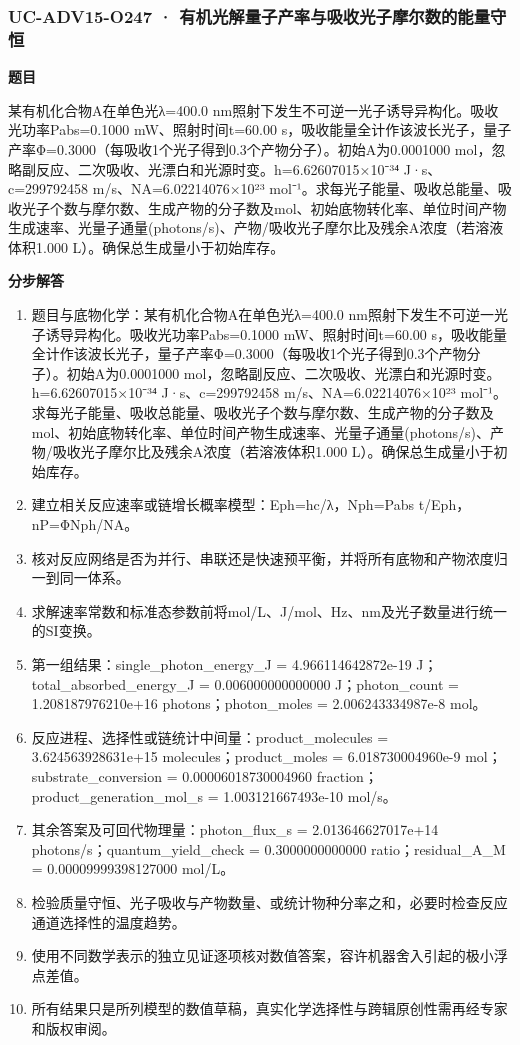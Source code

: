 \documentclass[UTF8,11pt,a4paper]{ctexart}
\begin{document}
\subsubsection*{UC-ADV15-O247 · 有机光解量子产率与吸收光子摩尔数的能量守恒}
\noindent\textbf{题目}\par
某有机化合物A在单色光λ=400.0 nm照射下发生不可逆一光子诱导异构化。吸收光功率Pabs=0.1000 mW、照射时间t=60.00 s，吸收能量全计作该波长光子，量子产率Φ=0.3000（每吸收1个光子得到0.3个产物分子）。初始A为0.0001000 mol，忽略副反应、二次吸收、光漂白和光源时变。h=6.62607015×10⁻³⁴ J·s、c=299792458 m/s、NA=6.02214076×10²³ mol⁻¹。求每光子能量、吸收总能量、吸收光子个数与摩尔数、生成产物的分子数及mol、初始底物转化率、单位时间产物生成速率、光量子通量(photons/s)、产物/吸收光子摩尔比及残余A浓度（若溶液体积1.000 L）。确保总生成量小于初始库存。\par
\medskip\noindent\textbf{分步解答}
\begin{enumerate}
\item 题目与底物化学：某有机化合物A在单色光λ=400.0 nm照射下发生不可逆一光子诱导异构化。吸收光功率Pabs=0.1000 mW、照射时间t=60.00 s，吸收能量全计作该波长光子，量子产率Φ=0.3000（每吸收1个光子得到0.3个产物分子）。初始A为0.0001000 mol，忽略副反应、二次吸收、光漂白和光源时变。h=6.62607015×10⁻³⁴ J·s、c=299792458 m/s、NA=6.02214076×10²³ mol⁻¹。求每光子能量、吸收总能量、吸收光子个数与摩尔数、生成产物的分子数及mol、初始底物转化率、单位时间产物生成速率、光量子通量(photons/s)、产物/吸收光子摩尔比及残余A浓度（若溶液体积1.000 L）。确保总生成量小于初始库存。
\item 建立相关反应速率或链增长概率模型：Eph=hc/λ，Nph=Pabs t/Eph，nP=ΦNph/NA。
\item 核对反应网络是否为并行、串联还是快速预平衡，并将所有底物和产物浓度归一到同一体系。
\item 求解速率常数和标准态参数前将mol/L、J/mol、Hz、nm及光子数量进行统一的SI变换。
\item 第一组结果：single\_photon\_energy\_J = 4.966114642872e-19 J；total\_absorbed\_energy\_J = 0.006000000000000 J；photon\_count = 1.208187976210e+16 photons；photon\_moles = 2.006243334987e-8 mol。
\item 反应进程、选择性或链统计中间量：product\_molecules = 3.624563928631e+15 molecules；product\_moles = 6.018730004960e-9 mol；substrate\_conversion = 0.00006018730004960 fraction；product\_generation\_mol\_s = 1.003121667493e-10 mol/s。
\item 其余答案及可回代物理量：photon\_flux\_s = 2.013646627017e+14 photons/s；quantum\_yield\_check = 0.3000000000000 ratio；residual\_A\_M = 0.00009999398127000 mol/L。
\item 检验质量守恒、光子吸收与产物数量、或统计物种分率之和，必要时检查反应通道选择性的温度趋势。
\item 使用不同数学表示的独立见证逐项核对数值答案，容许机器舍入引起的极小浮点差值。
\item 所有结果只是所列模型的数值草稿，真实化学选择性与跨辑原创性需再经专家和版权审阅。
\end{enumerate}
\end{document}
